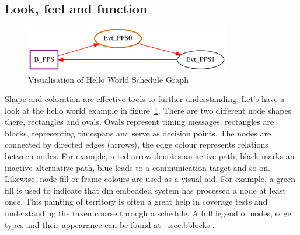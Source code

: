 \subsection{Look, feel and function}
\begin{figure}[H]
   \centering
   \def\svgwidth{0.5\textwidth}
   \includegraphics*[width=0.8\textwidth,keepaspectratio]{Figures/helloworld}
   \caption{Visualisation of Hello World Schedule Graph}
   \label{fig:hello}
\end{figure}
Shape and coloration are effective tools to further understanding. 
Let's have a look at the hello world example in figure~\ref{fig:hello}. There are two different node shapes there, rectangles and ovals. Ovals represent timing messages, rectangles are blocks, representing timespans and serve as decision points. The nodes are connected by directed edges (arrows), the edge colour represents relations between nodes. For example, a red arrow denotes an active path, black marks an inactive alternative path, blue leads to a communication target and so on. Likewise, node fill or frame colours are used as a visual aid. For example, a green fill is used to indicate that \gls{dm} embedded system has processed a node at least once. This painting of territory is often a great help in coverage tests and understanding the taken course through a schedule. A full legend of nodes, edge types and their appearance can be found at~\ref{ssec:bblocks}.
